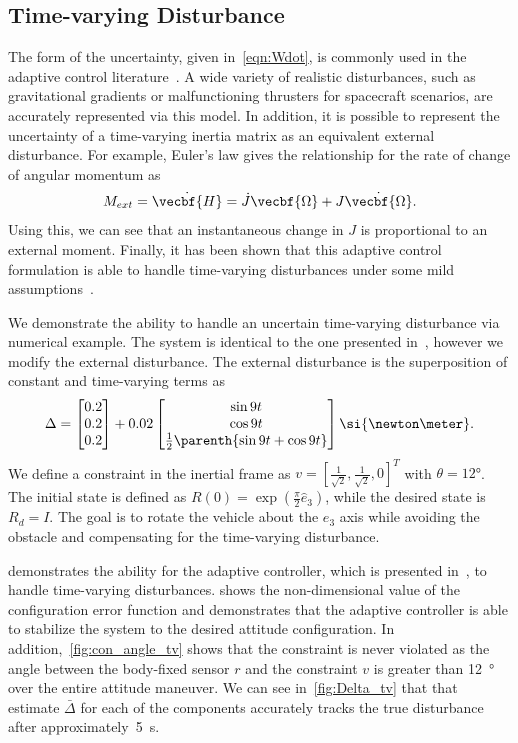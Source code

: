 \subsection{Time-varying Disturbance}\label{ssec:time_varying}
The form of the uncertainty, given in~\cref{eqn:Wdot}, is commonly used in the adaptive control literature~\cite{LeeITCST13,ioannou2012}. 
A wide variety of realistic disturbances, such as gravitational gradients or malfunctioning thrusters for spacecraft scenarios, are accurately represented via this model. 
In addition, it is possible to represent the uncertainty of a time-varying inertia matrix as an equivalent external disturbance. 
For example, Euler's law gives the relationship for the rate of change of angular momentum as
\begin{align*}
    M_{ext} = \dot{\vecbf{H}} = \dot{J} \vecbf{\Omega} + J \dot{\vecbf{\Omega}} .
\end{align*}
Using this, we can see that an instantaneous change in \( J \) is proportional to an external moment.
Finally, it has been shown that this adaptive control formulation is able to handle time-varying disturbances under some mild assumptions~\cite{ioannou2012}. 

We demonstrate the ability to handle an uncertain time-varying disturbance via numerical example.
The system is identical to the one presented in~, however we modify the external disturbance. 
The external disturbance is the superposition of constant and time-varying terms as
\begin{align*}
    \Delta = \begin{bmatrix} 0.2 \\ 0.2 \\0.2 \end{bmatrix} + 0.02 \begin{bmatrix} \sin 9 t \\ \cos 9 t \\ \frac{1}{2} \parenth{\sin 9t + \cos 9t}\end{bmatrix} \si{\newton\meter}.
\end{align*}
We define a constraint in the inertial frame as \( v = [\frac{1}{\sqrt{2}}, \frac{1}{\sqrt{2}}, 0]^T \) with \( \theta = \ang{12} \).
The initial state is defined as \(R(0) = \exp( \frac{\pi}{2} \hat{e}_3) \), while the desired state is \(R_d =I \).
The goal is to rotate the vehicle about the \( e_3 \) axis while avoiding the obstacle and compensating for the time-varying disturbance. 

 demonstrates the ability for the adaptive controller, which is presented in~, to handle time-varying disturbances.
 shows the non-dimensional value of the configuration error function and demonstrates that the adaptive controller is able to stabilize the system to the desired attitude configuration.
In addition,~\cref{fig:con_angle_tv} shows that the constraint is never violated as the angle between the body-fixed sensor \( r \) and the constraint \( v \) is greater than \SI{12}{\degree} over the entire attitude maneuver.
We can see in~\cref{fig:Delta_tv} that that estimate \(\bar \Delta \) for each of the components accurately tracks the true disturbance after approximately~\SI{5}{\second}.

